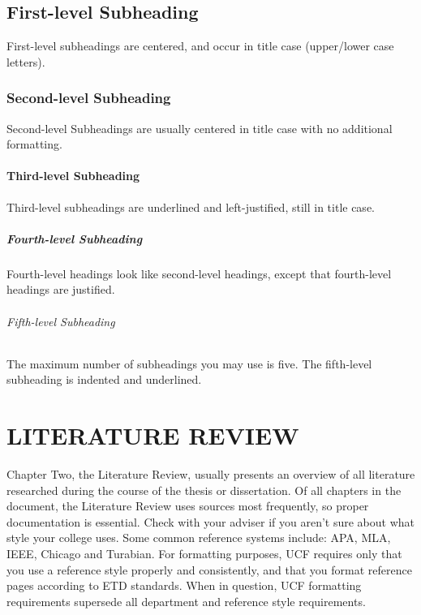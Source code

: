 \documentclass{UCF_ETD}
\begin{document}
\section{First-level Subheading}
First-level subheadings are centered, and occur in title case (upper/lower case letters). 

\subsection{Second-level Subheading}
Second-level Subheadings are usually centered in title case with no additional formatting. 

\subsubsection{Third-level Subheading}
Third-level subheadings are underlined and left-justified, still in title case. 

\paragraph{Fourth-level Subheading}
Fourth-level headings look like second-level headings, except that fourth-level headings are justified.

\subparagraph{Fifth-level Subheading}
The maximum number of subheadings you may use is five.  The fifth-level subheading is indented and underlined. 


\chapter{LITERATURE REVIEW}
Chapter Two, the Literature Review, usually presents an overview of all literature researched during the course of the thesis or dissertation. Of all chapters in the document, the Literature Review uses sources most frequently, so proper documentation is essential. Check with your adviser if you aren’t sure about what style your college uses. Some common reference systems include: APA, MLA, IEEE, Chicago and Turabian. For formatting purposes, UCF requires only that you use a reference style properly and consistently, and that you format reference pages according to ETD standards. When in question, UCF formatting requirements supersede all department and reference style requirements.
\end{document}
